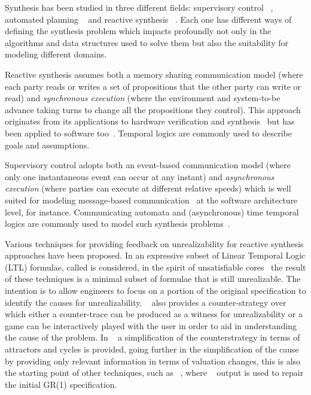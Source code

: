 Synthesis has been studied in three different fields: supervisory control 
~\cite{ramadge:1989}, automated planning ~\cite{fikes1971strips,penberthy1992ucpop} and reactive synthesis ~\cite{harel1985development,pnueli1985transition}.  Each one has different ways of defining the synthesis problem 
which impacts profoundly not only in the algorithms and data structures used to solve 
them but also the suitability for modeling different domains. 

Reactive synthesis assumes both a memory sharing communication model (where each party reads 
or writes a set of propositions that the other party can write or read) and 
\textit{synchronous execution} (where the environment and system-to-be advance 
taking turns to change all the propositions they control). This approach 
originates from its applications to hardware verification and synthesis~\cite{DBLP:conf/popl/PnueliR89} but has 
been applied to software too~\cite{manna1980deductive}. Temporal logics 
are commonly used to describe goals and assumptions. 

Supervisory control adopts both an event-based communication model (where only one 
instantaneous event can occur at any instant) and \textit{asynchronous execution} (where parties can execute at 
different relative speeds) which is well suited for modeling message-based 
communication~\cite{DBLP:journals/cacm/Hoare78, Milner:1982} at the software architecture level, for instance. 
Communicating automata  and (asynchronous) time temporal logics are commonly used 
to model such synthesis problems~\cite{ramadge:1989}. 

Various techniques for providing feedback on unrealizability for reactive synthesis 
approaches have been proposed. In \cite{DBLP:conf/fmcad/KonighoferHB09, 
DBLP:journals/scp/Schuppan12,DBLP:conf/fmcad/AlurMT13,maoz2021unrealizable}
an expressive subset of Linear Temporal 
Logic (LTL) formulae, called \gr is considered, in the spirit of unsatisfiable cores~\cite{Torlak:2008} the result of these techniques is a minimal subset of formulae that is still 
unrealizable. The intention is to allow engineers to focus on a portion of the original 
specification to identify the causes for unrealizability. 
~\cite{DBLP:conf/fmcad/KonighoferHB09} also provides a counter-strategy over which 
either a counter-trace can be produced as a witness for unrealizability or a game can be 
interactively played with the user in order to aid in understanding the cause of the 
problem. In ~\cite{DBLP:conf/sigsoft/KuventMR17} a simplification of the 
counterstrategy in terms of attractors and cycles is provided, going further in the 
simplification of the cause by providing only relevant information in terms of valuation 
changes, this is also the starting point of other techniques, such as 
~\cite{maoz2019symbolic}, where ~\cite{DBLP:conf/sigsoft/KuventMR17} output is 
used to repair the initial GR(1) specification.

